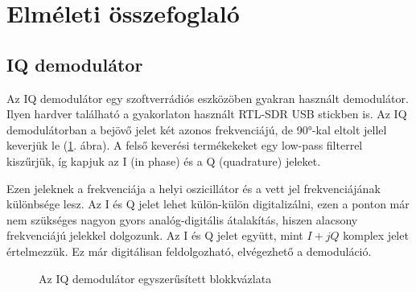 \documentclass[12pt,a4paper]{article}
\begin{document}
\section{Elméleti összefoglaló}


\subsection{IQ demodulátor}
Az IQ demodulátor egy szoftverrádiós eszközöben gyakran használt demodulátor.
Ilyen hardver található a gyakorlaton használt RTL-SDR USB stickben is.
Az IQ demodulátorban a bejövő jelet két azonos frekvenciájú, de 90°-kal eltolt jellel keverjük le (\ref{fig:iq}. ábra). 
A felső keverési termékekeket egy low-pass filterrel kiszűrjük, íg kapjuk az I (in phase) és a Q (quadrature) jeleket.

Ezen jeleknek a frekvenciája a helyi oszicillátor és a vett jel frekvenciájának különbsége lesz.
Az I és Q jelet lehet külön-külön digitalizálni, ezen a ponton már nem szükséges nagyon gyors analóg-digitális átalakítás, hiszen alacsony frekvenciájú jelekkel dolgozunk. 
Az I és Q jelet együtt, mint $I + jQ$ komplex jelet értelmezzük.
Ez már digitálisan feldolgozható, elvégezhető a demoduláció. 

\begin{figure}[H]
\label{fig:iq}
\centering
{}
\caption{
Az IQ demodulátor egyszerűsített blokkvázlata} 
\end{figure}
\end{document}
